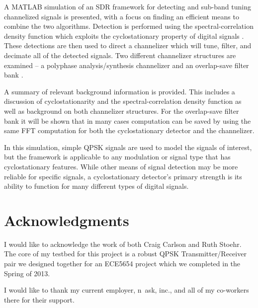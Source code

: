 \documentclass[12pt]{report}
\begin{document}
A MATLAB simulation of an SDR framework for detecting and sub-band tuning
channelized signals is presented, with a focus on finding an efficient means to
combine the two algorithms. Detection is performed using the
spectral-correlation density function which exploits the cyclostationary
property of digital signals \cite{Gardner1}.  These detections are then used to
direct a channelizer which will tune, filter, and decimate all of the detected
signals. Two different channelizer structures are examined – a polyphase
analysis/synthesis channelizer \cite{Harris1} and an overlap-save filter bank
\cite{Borgerding1}.

A summary of relevant background information is provided.  This includes
a discussion of cyclostationarity and the spectral-correlation density function
as well as background on both channelizer structures. For the overlap-save
filter bank it will be shown that in many cases computation can be saved by
using the same FFT computation for both the cyclostationary detector and the
channelizer.

In this simulation, simple QPSK signals are used to model the signals of
interest, but the framework is applicable to any modulation or signal type that
has cyclostationary features. While other means of signal detection may be more
reliable for specific signals, a cyclostationary detector's primary strength is
its ability to function for many different types of digital signals.


\vfill



\pagebreak

\chapter*{Acknowledgments}
I would like to acknowledge the work of both Craig Carlson and Ruth Stoehr.
The core of my testbed for this project is a robust QPSK Transmitter/Receiver
pair we designed together for an ECE5654 project which we completed in the
Spring of 2013.

I would like to thank my current employer, n~ask, inc., and all of my
co-workers there for their support.
\end{document}
